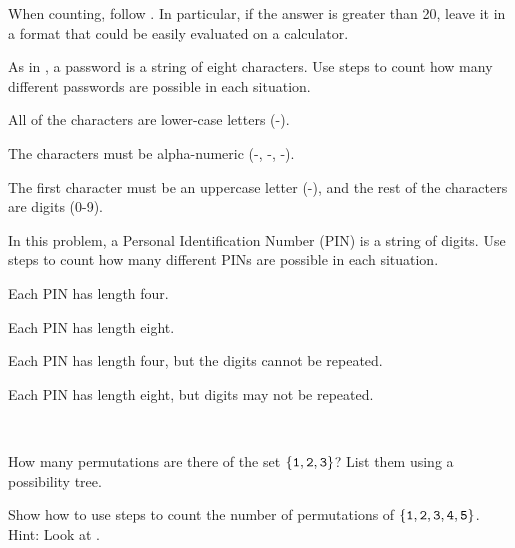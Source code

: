 When counting, follow .  In particular, if the answer is greater than 20, leave it in a format that could be easily evaluated on a calculator.

\begin{exer} [\exerP] %
\label{exer_alphanumeric_passwords}
    As in , a password is a string of eight characters. Use steps to count how many different passwords are possible in each situation.
    \begin{exerpart}
        \item All of the characters are lower-case letters (-).  
        \item The characters must be alpha-numeric (-, -, -).
        \item The first character must be an uppercase letter (-), and the rest of the characters are digits (0-9).  
    \end{exerpart}
\end{exer}

\begin{exer} [\exerP] %
\label{exer_PIN}
    In this problem, a Personal Identification Number (PIN) is a string of digits. Use steps to count how many different PINs are possible in each situation.
    \begin{exerpart}
        \item Each PIN has length four.
        \item Each PIN has length eight.
        \item Each PIN has length four, but the digits cannot be repeated.
        \item Each PIN has length eight, but digits may not be repeated.
    \end{exerpart}
\end{exer}

\begin{exer} [\exerP] %
\label{exer_perms_12345} 
~
    \begin{exerpart}
        \item How many permutations are there of the set $\{\texttt{1},\texttt{2},\texttt{3}\}$?  List them using a possibility tree.
        \item Show how to use steps to count the number of permutations of $\{\texttt{1},\texttt{2},\texttt{3}, \texttt{4}, \texttt{5}\}$. Hint: Look at .  
    \end{exerpart}
\end{exer}

